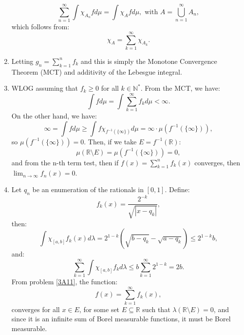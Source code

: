 \begin{enumerate}[label=\textbf{3A.\arabic*}]
    \[
      \sum_{n = 1}^{\infty} \int \chi_{A_{n}} f d\mu = \int \chi_{A} fd \mu,
      \text{ with } A = \bigcup_{n = 1}^{\infty} A_{n}
    ,\] which follows from:
    \[
      \chi_{A} = \sum_{k = 1}^{\infty} \chi_{A_{k}}
    .\] 
  \item Letting \( g_{n} = \sum_{k = 1}^{n} f_{k} \) and this is simply the Monotone
    Convergence Theorem (MCT) and additivity of the Lebesgue integral.
  \item \label{3A11}
    WLOG assuming that \( f_{k} \ge 0 \) for all \( k \in \mathbb{N}^{*} \).
    From the MCT, we have:
    \[
      \int f d\mu  = \int \sum_{k = 1}^{\infty} f_{k}d\mu < \infty
    .\] 
    On the other hand, we have:
    \[
      \infty = \int fd\mu \ge \int f\chi_{f^{-1}(\{\infty\}  )}d\mu = \infty \cdot \mu
      (f^{-1}(\{\infty\}  ))
    ,\] so \( \mu (f^{-1}(\{\infty\}  )) = 0 \). Then, if we take \( E =
    f^{-1}(\mathbb{R}) \):
    \[
      \mu (\mathbb{R} \setminus E) = \mu (f^{-1}(\{\infty\}  )) = 0
    ,\] and from the n-th term test, then if \( f(x) = \sum_{k = 1}^{n} f_{k}(x)
    \) converges, then \( \lim_{n \to \infty} f_{n}(x) = 0 \).
  \item Let \( q_{n} \) be an enumeration of the rationals in \( [0, 1] \).
    Define:
    \[
      f_{k}(x) = \frac{2^{-k}}{\sqrt{|x-q_{k}|}}
    ,\] then:
    \[
      \int \chi_{[a, b]}f_{k}(x) d\lambda = 2^{1-k} \left( \sqrt{b - q_{k}} -
        \sqrt{a - q_{k}} \right)  \le  2^{1-k}b
    ,\] and:
    \[
      \sum_{k = 1}^{\infty} \int \chi_{[a, b]}f_{k} d\lambda \le  b\sum_{k =
      1}^{\infty} 2^{1-k} = 2b
    .\] 
    From problem \ref{3A11}, the function:
    \[
      f(x) = \sum_{k = 1}^{\infty} f_{k}(x)
    ,\] converges for all \( x \in E \), for some set \( E \subseteq \mathbb{R}
    \) such that \( \lambda (\mathbb{R} \setminus E) = 0 \), and since it is an
    infinite sum
    of Borel measurable functions, it must be Borel measurable.


\end{enumerate}

